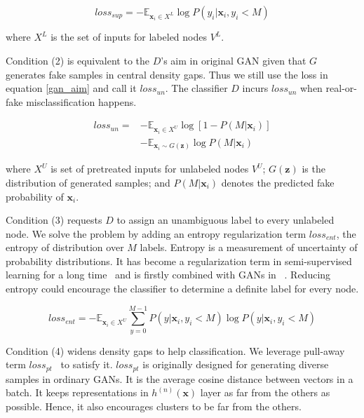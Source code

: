 \begin{equation}
	loss_{sup} = -\mathbb{E}_{\mathbf{x}_i\in X^L} \log P(y_i|\mathbf{x}_i, y_i < M)
\end{equation}

\noindent where $X^L$ is the set of inputs for labeled nodes $V^L$.
	
Condition (2) is equivalent to the $D$'s aim in original GAN given that $G$ generates fake samples in central density gaps. Thus we still use the loss in equation \ref{gan_aim} and call it $loss_{un}$. The classifier $D$ incurs $loss_{un}$ when real-or-fake misclassification happens.  
    
\begin{equation}
\begin{aligned}
	loss_{un} =& -\mathbb{E}_{\mathbf{x}_i \in X^U} \log [1-P(M|\mathbf{x}_i)] \\&- \mathbb{E}_{\mathbf{x}_i \sim G(\mathbf{z})} \log P(M|\mathbf{x}_i)
\end{aligned}
\end{equation}

\noindent where $X^U$ is set of pretreated inputs for unlabeled nodes $V^U$; $G(\mathbf{z})$ is the distribution of generated samples; and $P(M|\mathbf{x}_i)$ denotes the predicted fake probability of $\mathbf{x}_i$. 

Condition (3) requests $D$ to assign an unambiguous label to every unlabeled node. We solve the problem by adding an entropy regularization term $loss_{ent}$, the entropy of distribution over $M$ labels. Entropy is a measurement of uncertainty of probability distributions. It has become a regularization term in semi-supervised learning for a long time~\cite{grandvalet2005semi} and is firstly combined with GANs in ~\cite{springenberg2015unsupervised}. Reducing entropy could encourage the classifier to determine a definite label for every node.

\begin{equation}
	loss_{ent} = -\mathbb{E}_{\mathbf{x}_i \in X^U} \sum\limits_{y=0}^{M-1} P(y|\mathbf{x}_i, y_i < M)\log P(y|\mathbf{x}_i, y_i < M) 
\end{equation}

Condition (4) widens density gaps to help classification. We leverage pull-away term $loss_{pt}$~\cite{zhao2016energy} to satisfy it. $loss_{pt}$ is originally designed for generating diverse samples in ordinary GANs. It is the average cosine distance between vectors in a batch. It keeps representations in $h^{(n)}(\mathbf{x})$ layer as far from the others as possible. Hence, it also encourages clusters to be far from the others.

